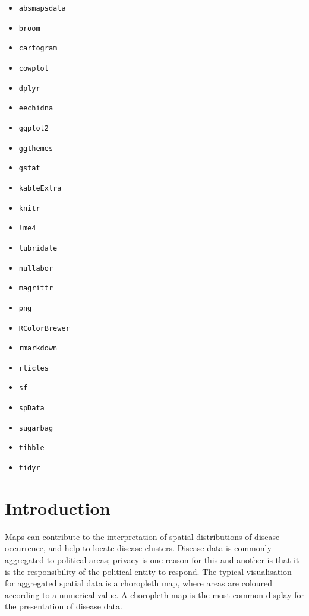 \documentclass{monashthesis}
\begin{document}
\begin{itemize}
\tightlist
\item
  \texttt{absmapsdata} \autocite{ABSmaps}
\item
  \texttt{broom} \autocite{broom}
\item
  \texttt{cartogram} \autocite{cartogram}
\item
  \texttt{cowplot} \autocite{cowplot}
\item
  \texttt{dplyr} \autocite{dplyr}
\item
  \texttt{eechidna} \autocite{eechidna}
\item
  \texttt{ggplot2} \autocite{ggplot2}
\item
  \texttt{ggthemes} \autocite{ggthemes}
\item
  \texttt{gstat} \autocite{gstat}
\item
  \texttt{kableExtra} \autocite{kableExtra}
\item
  \texttt{knitr} \autocite{knitr}
\item
  \texttt{lme4} \autocite{lme4}
\item
  \texttt{lubridate} \autocite{lubridate}
\item
  \texttt{nullabor} \autocite{nullabor}
\item
  \texttt{magrittr} \autocite{magrittr}
\item
  \texttt{png} \autocite{png}
\item
  \texttt{RColorBrewer} \autocite{RColorBrewer}
\item
  \texttt{rmarkdown} \autocite{rmarkdown}
\item
  \texttt{rticles} \autocite{rticles}
\item
  \texttt{sf} \autocite{sf}
\item
  \texttt{spData} \autocite{spData}
\item
  \texttt{sugarbag} \autocite{sugarbag}
\item
  \texttt{tibble} \autocite{tibble}
\item
  \texttt{tidyr} \autocite{tibble}
\end{itemize}

\hypertarget{intro}{%
\chapter{Introduction}\label{intro}}

Maps can contribute to the interpretation of spatial distributions of disease occurrence, and help to locate disease clusters. Disease data is commonly aggregated to political areas; privacy is one reason for this and another is that it is the responsibility of the political entity to respond. The typical visualisation for aggregated spatial data is a choropleth map, where areas are coloured according to a numerical value. A choropleth map is the most common display for the presentation of disease data.
\end{document}
